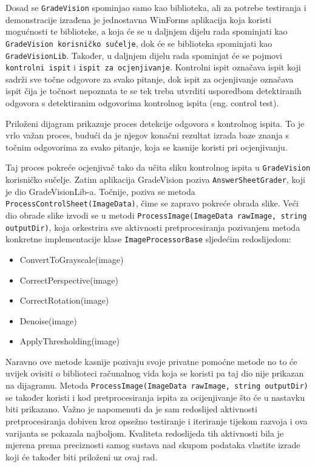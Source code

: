 \documentclass{foi}
\begin{document}
Dosad se \texttt{GradeVision} spominjao samo kao biblioteka, ali za potrebe testiranja i demonstracije izrađena je jednostavna WinForms aplikacija koja koristi mogućnosti te biblioteke, a koja će se u daljnjem dijelu rada spominjati kao \texttt{GradeVision korisničko sučelje}, dok će se biblioteka spominjati kao \texttt{GradeVisionLib}. Također, u daljnjem dijelu rada spominjat će se pojmovi \texttt{kontrolni ispit} i \texttt{ispit za ocjenjivanje}. Kontrolni ispit označava ispit koji sadrži sve točne odgovore za svako pitanje, dok ispit za ocjenjivanje označava ispit čija je točnost nepoznata te se tek treba utvrditi usporedbom detektiranih odgovora s detektiranim odgovorima kontrolnog ispita (eng. control test).

Priloženi dijagram prikazuje proces detekcije odgovora s kontrolnog ispita. To je vrlo važan proces, budući da je njegov konačni rezultat izrada baze znanja s točnim odgovorima za svako pitanje, koja se kasnije koristi pri ocjenjivanju.

Taj proces pokreće ocjenjivač  tako da učita sliku kontrolnog ispita u \texttt{GradeVision} korisničko sučelje. Zatim aplikacija GradeVision poziva \texttt{AnswerSheetGrader}, koji je dio GradeVisionLib-a. Točnije, poziva se metoda \texttt{ProcessControlSheet(ImageData)}, čime se zapravo pokreće obrada slike. Veći dio obrade slike izvodi se u metodi \texttt{ProcessImage(ImageData rawImage, string outputDir)}, koja orkestrira sve aktivnosti pretprocesiranja pozivanjem metoda konkretne implementacije klase \texttt{ImageProcessorBase} sljedećim redoslijedom:

\begin{itemize}
\item ConvertToGrayscale(image)
\item CorrectPerspective(image)
\item CorrectRotation(image)
\item Denoise(image)
\item ApplyThresholding(image)
\end{itemize}

Naravno ove metode kasnije pozivaju svoje privatne pomoćne metode no to će uvijek ovisiti o biblioteci računalnog vida koja se koristi pa taj dio nije prikazan na dijagramu. Metoda \texttt{ProcessImage(ImageData rawImage, string outputDir)} se također koristi i kod pretprocesiranja ispita za ocijenjivanje što će u nastavku biti prikazano. Važno je napomenuti da je sam  redoslijed aktivnosti pretprocesiranja dobiven kroz opsežno testiranje i iteriranje tijekom razvoja i ova varijanta se pokazala najboljom. Kvaliteta redoslijeda tih aktivnosti bila je mjerena prema preciznosti samog sustava nad skupom podataka vlastite izrade koji će također biti priloženi uz ovaj rad.
\end{document}
